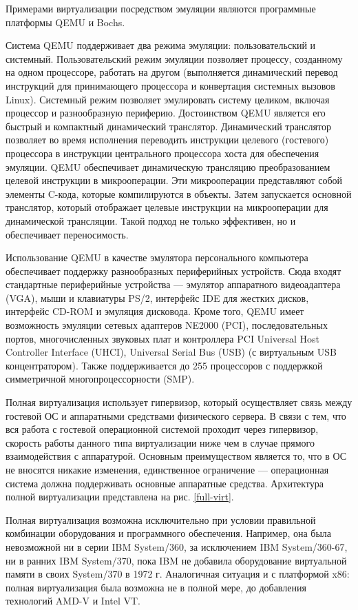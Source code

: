 Примерами виртуализации посредством эмуляции являются программные платформы QEMU и Bochs.

Система QEMU поддерживает два режима эмуляции: пользовательский и системный.
Пользовательский режим эмуляции позволяет процессу, созданному на одном процессоре, работать на другом (выполняется динамический перевод инструкций для принимающего процессора и конвертация системных вызовов Linux).
Системный режим позволяет эмулировать систему целиком, включая процессор и разнообразную периферию.
Достоинством QEMU является его быстрый и компактный динамический транслятор.
Динамический транслятор позволяет во время исполнения переводить инструкции целевого (гостевого) процессора в инструкции центрального процессора хоста для обеспечения эмуляции.
QEMU обеспечивает динамическую трансляцию преобразованием целевой инструкции в микрооперации.
Эти микрооперации представляют собой элементы C-кода, которые компилируются в объекты.
Затем запускается основной транслятор, который отображает целевые инструкции на микрооперации для динамической трансляции.
Такой подход не только эффективен, но и обеспечивает переносимость.

Использование QEMU в качестве эмулятора персонального компьютера обеспечивает поддержку разнообразных периферийных устройств.
Сюда входят стандартные периферийные устройства --- эмулятор аппаратного видеоадаптера (VGA), мыши и клавиатуры PS/2, интерфейс IDE для жестких дисков, интерфейс CD-ROM и эмуляция дисковода.
Кроме того, QEMU имеет возможность эмуляции сетевых адаптеров NE2000 (PCI), последовательных портов, многочисленных звуковых плат и контроллера PCI Universal Host Controller Interface (UHCI), Universal Serial Bus (USB) (с виртуальным USB концентратором).
Также поддерживается до 255 процессоров с поддержкой симметричной многопроцессорности (SMP).

Полная виртуализация использует гипервизор, который осуществляет связь между гостевой ОС и аппаратными средствами физического сервера.
В связи с тем, что вся работа с гостевой операционной системой проходит через гипервизор, скорость работы данного типа виртуализации ниже чем в случае прямого взаимодействия с аппаратурой.
Основным преимуществом является то, что в ОС не вносятся никакие изменения, единственное ограничение --- операционная система должна поддерживать основные аппаратные средства.
Архитектура полной виртуализации представлена на рис. \ref{full-virt}.

Полная виртуализация возможна исключительно при условии правильной комбинации оборудования и программного обеспечения.
Например, она была невозможной ни в серии IBM System/360, за исключением IBM System/360-67, ни в ранних IBM System/370, пока IBM не добавила оборудование виртуальной памяти в своих System/370 в 1972 г.
Аналогичная ситуация и с платформой x86: полная виртуализация была возможна не в полной мере, до добавления технологий AMD-V и Intel VT.

